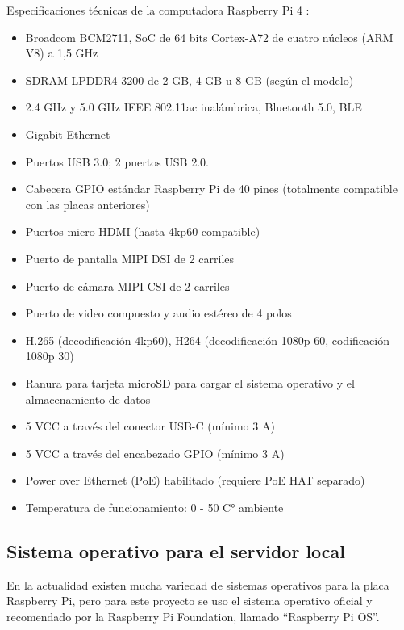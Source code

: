 
\vspace{1cm}

Especificaciones técnicas de la computadora Raspberry Pi 4 \citep{WEBSITE:7}:

\begin{itemize}
\item Broadcom BCM2711, SoC de 64 bits Cortex-A72 de cuatro núcleos (ARM V8) a 1,5 GHz
\item SDRAM LPDDR4-3200 de 2 GB, 4 GB u 8 GB (según el modelo)
\item 2.4 GHz y 5.0 GHz IEEE 802.11ac inalámbrica, Bluetooth 5.0, BLE
\item Gigabit Ethernet
\item Puertos USB 3.0; 2 puertos USB 2.0.
\item Cabecera GPIO estándar Raspberry Pi de 40 pines (totalmente compatible con las placas anteriores)
\item Puertos micro-HDMI (hasta 4kp60 compatible)
\item Puerto de pantalla MIPI DSI de 2 carriles
\item Puerto de cámara MIPI CSI de 2 carriles
\item Puerto de video compuesto y audio estéreo de 4 polos
\item H.265 (decodificación 4kp60), H264 (decodificación 1080p 60, codificación 1080p 30)
\item Ranura para tarjeta microSD para cargar el sistema operativo y el almacenamiento de datos
\item 5 VCC a través del conector USB-C (mínimo 3 A)
\item 5 VCC a través del encabezado GPIO (mínimo 3 A)
\item Power over Ethernet (PoE) habilitado (requiere PoE HAT separado)
\item Temperatura de funcionamiento: 0 - 50 C° ambiente
\end{itemize}

\subsection{Sistema operativo para el servidor local}

En la actualidad existen mucha variedad de sistemas operativos para la placa Raspberry Pi, pero para este proyecto se uso el sistema operativo oficial y recomendado por la Raspberry Pi Foundation, llamado ``Raspberry Pi OS''.

